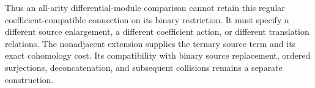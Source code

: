 Thus an all-arity differential-module comparison cannot retain this regular coefficient-compatible connection on its binary restriction.
It must specify a different source enlargement, a different coefficient action, or different translation relations.
The nonadjacent extension supplies the ternary source term and its exact cohomology cost.
Its compatibility with binary source replacement, ordered surjections, deconcatenation, and subsequent collisions remains a separate construction.
